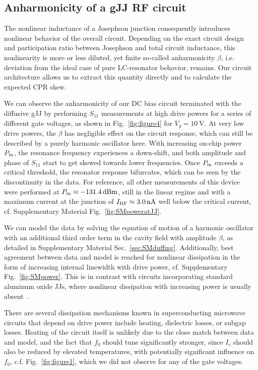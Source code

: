 \subsection{Anharmonicity of a gJJ RF circuit}

The nonlinear inductance of a Josephson junction consequently introduces nonlinear behavior of the overall circuit.
%
Depending on the exact circuit design and participation ratio between Josephson and total circuit inductance, this nonlinearity is more or less diluted, yet finite so-called anharmonicity $\beta$, i.e. deviation from the ideal case of pure LC-resonator behavior, remains.
%
Our circuit architecture allows us to extract this quantity directly and to calculate the expected CPR skew.

We can observe the anharmonicity of our DC bias circuit terminated with the diffusive gJJ by performing $S_{11}$ measurements at high drive powers for a series of different gate voltages, as shown in Fig.~\ref{fig:figure4} for $V_g=\SI{+10}{\volt}$.
%
At very low drive powers, the $\beta$ has negligible effect on the circuit response, which can still be described by a purely harmonic oscillator here.
%
With increasing on-chip power $P_{\rm in}$, the resonance frequency experiences a down-shift, and both amplitude and phase of $S_{11}$ start to get skewed towards lower frequencies.
%
Once $P_{\rm in}$ exceeds a critical threshold, the resonator response bifurcates, which can be seen by the discontinuity in the data.
%
For reference, all other measurements of this device were performed at $P_{\rm in}\approx\SI{-131.4}{dBm}$, still in the linear regime and with a maximum current at the junction of $I_{\rm RF}\approx\SI{3.0}{\nano\ampere}$ well below the critical current, cf. Supplementary Material Fig.~\ref{fig:SMpoweratJJ}.

We can model the data by solving the equation of motion of a harmonic oscillator with an additional third order term in the cavity field with  amplitude $\beta$, as detailed in Supplementary Material Sec.~\ref{sec:SMduffing}.
%
Additionally, best agreement between data and model is reached for nonlinear dissipation in the form of increasing internal linewidth with drive power, cf. Supplementary Fig.~\ref{fig:SMpower}.
%
This is in contrast with circuits incorporating standard aluminum oxide JJs, where nonlinear dissipation with increasing power is usually absent~\cite{boakninDispersiveMicrowaveBifurcation2007b}.

There are several dissipation mechanisms known in superconducting microwave circuits that depend on drive power include heating, dielectric losses, or subgap losses.
%
Heating of the circuit itself is unlikely due to the close match between data and model, and the fact that $f_0$ should tune significantly stronger, since $I_c$ should also be reduced by elevated temperatures, with potentially significant influence on $f_0$, c.f. Fig.~\ref{fig:figure1}, which we did not observe for any of the gate voltages.

